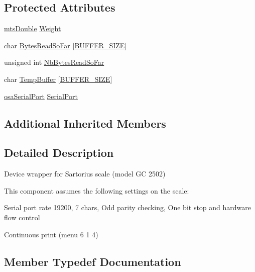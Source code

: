 \subsection*{Protected Attributes}
\begin{DoxyCompactItemize}
\item 
\hyperlink{mts_generic_object_proxy_8h_a31e76b0190a8d3f9838626cd7b47bd75}{mts\+Double} \hyperlink{classmts_sartorius_serial_a5fd5e0fcfe8b161a1663059026bcd298}{Weight}
\item 
char \hyperlink{classmts_sartorius_serial_ae348c055cadd8ffe27284c8e2a9924d5}{Bytes\+Read\+So\+Far} \mbox{[}\hyperlink{classmts_sartorius_serial_a14d6fa459e993354125cf4a0d9420000a7a2c0b5e39b999002353c52f30f82d1f}{B\+U\+F\+F\+E\+R\+\_\+\+S\+I\+Z\+E}\mbox{]}
\item 
unsigned int \hyperlink{classmts_sartorius_serial_a124551b1b4929356d1b40d78666316ed}{Nb\+Bytes\+Read\+So\+Far}
\item 
char \hyperlink{classmts_sartorius_serial_a0b786c0a9cf4fbefff9d6727c9f6fd56}{Temp\+Buffer} \mbox{[}\hyperlink{classmts_sartorius_serial_a14d6fa459e993354125cf4a0d9420000a7a2c0b5e39b999002353c52f30f82d1f}{B\+U\+F\+F\+E\+R\+\_\+\+S\+I\+Z\+E}\mbox{]}
\item 
\hyperlink{classosa_serial_port}{osa\+Serial\+Port} \hyperlink{classmts_sartorius_serial_af266db2d34490ee1fe17c10b8aba6be8}{Serial\+Port}
\end{DoxyCompactItemize}
\subsection*{Additional Inherited Members}


\subsection{Detailed Description}
Device wrapper for Sartorius scale (model G\+C 2502) 

This component assumes the following settings on the scale\+:
\begin{DoxyItemize}
\item Serial port rate 19200, 7 chars, Odd parity checking, One bit stop and hardware flow control
\item Continuous print (menu 6 1 4) 
\end{DoxyItemize}

\subsection{Member Typedef Documentation}
\hypertarget{classmts_sartorius_serial_a84eee50d0f43b06e6adac9ae20f4f02c}{}
